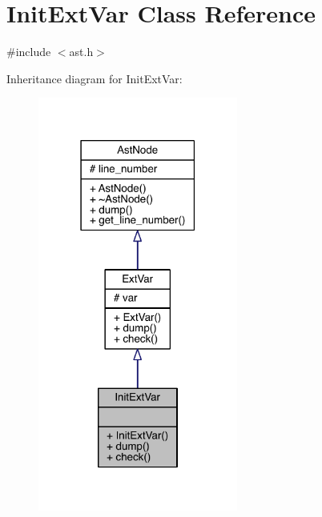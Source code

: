 \hypertarget{class_init_ext_var}{}\section{Init\+Ext\+Var Class Reference}
\label{class_init_ext_var}


{\ttfamily \#include $<$ast.\+h$>$}



Inheritance diagram for Init\+Ext\+Var\+:\nopagebreak
\begin{figure}[H]
\begin{center}
\leavevmode
\includegraphics[width=186pt]{class_init_ext_var__inherit__graph}
\end{center}
\end{figure}


